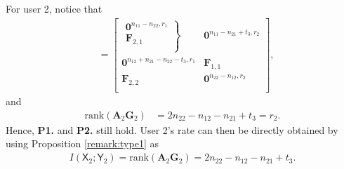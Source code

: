 \documentclass[12pt, draftclsnofoot, onecolumn]{IEEEtran}
\newcommand{\msf}[1]{\mathsf{#1}}
\theoremstyle{definition}
\begin{document}
For user 2, notice that
\begin{align}
[\boldsymbol{A}_2\boldsymbol{G}_2 \; \boldsymbol{B}_2\boldsymbol{G}_1] &=\begin{bmatrix}
\left. {\begin{array}{*{20}{c}}
 \boldsymbol{0}^{n_{11} - n_{22},r_1}\\
\boldsymbol{F}_{2,1}\\
 \end{array}} \right\}& \boldsymbol{0}^{n_{11} - n_{21}+t_3,r_2}\\
\boldsymbol{0}^{n_{12} +n_{21}- n_{22}-t_3,r_1} & \boldsymbol{F}_{1,1}\\
\boldsymbol{F}_{2,2} & \boldsymbol{0}^{n_{22} - n_{12},r_2}\\
\end{bmatrix},
\end{align}
and
\begin{align}
\text{rank}(\boldsymbol{A}_2\boldsymbol{G}_2) &= 2n_{22}-n_{12}-n_{21}+t_3 = r_2.
\end{align}
Hence, {\bf P1.} and {\bf P2.} still hold. User 2's rate can then be directly obtained by using Proposition \ref{remark:type1} as
\begin{align}
I(\msf{X}_2;\msf{Y}_2) =\text{rank}(\boldsymbol{A}_2\boldsymbol{G}_2) = 2n_{22}-n_{12}-n_{21}+t_3.
\end{align}

%
\end{document}
